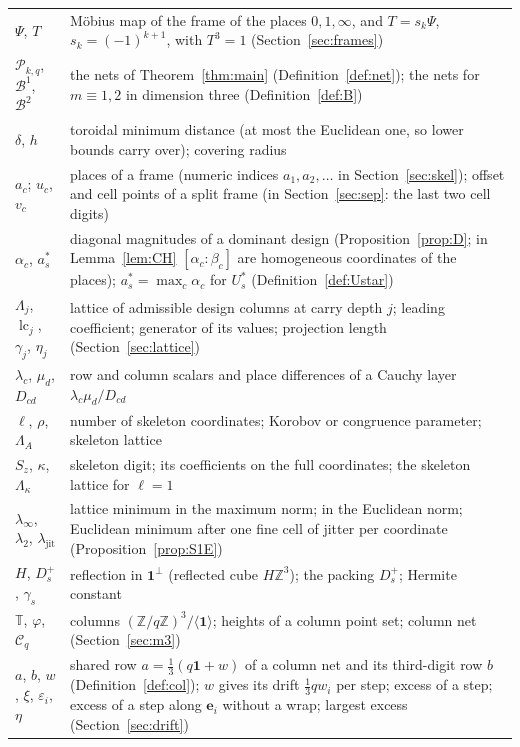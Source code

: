 \documentclass[11pt]{amsart}
\theoremstyle{definition}
\theoremstyle{plain}
\newcommand{\Z}{\mathbb{Z}}
\newcommand{\e}{\mathbf{e}}
\begin{document}
\begin{table}[tbp]
\begin{tabular}{@{}l>{\raggedright\arraybackslash}p{11.5cm}@{}}
$\Psi$, $T$ & M\"obius map of the frame of the places $0,1,\infty$, and $T=s_k\Psi$, $s_k=(-1)^{k+1}$, with $T^3=1$ (Section~\ref{sec:frames})\\
$\mathcal P_{k,q}$, $\mathcal B^1$, $\mathcal B^2$ & the nets of Theorem~\ref{thm:main} (Definition~\ref{def:net}); the nets for $m\equiv1,2$ in dimension three (Definition~\ref{def:B})\\
$\delta$, $h$ & toroidal minimum distance (at most the Euclidean one, so lower bounds carry over); covering radius\\
$a_c$; $u_c$, $v_c$ & places of a frame (numeric indices $a_1,a_2,\dots$ in Section~\ref{sec:skel}); offset and cell points of a split frame (in Section~\ref{sec:sep}: the last two cell digits)\\
$\alpha_c$, $a^*_s$ & diagonal magnitudes of a dominant design (Proposition~\ref{prop:D}; in Lemma~\ref{lem:CH} $[\alpha_c:\beta_c]$ are homogeneous coordinates of the places); $a^*_s=\max_c\alpha_c$ for $U^*_s$ (Definition~\ref{def:Ustar})\\
$\Lambda_j$, $\operatorname{lc}_j$, $\gamma_j$, $\eta_j$ & lattice of admissible design columns at carry depth $j$; leading coefficient; generator of its values; projection length (Section~\ref{sec:lattice})\\
$\lambda_c$, $\mu_d$, $D_{cd}$ & row and column scalars and place differences of a Cauchy layer $\lambda_c\mu_d/D_{cd}$\\
$\ell$, $\rho$, $\Lambda_A$ & number of skeleton coordinates; Korobov or congruence parameter; skeleton lattice\\
$S_z$, $\kappa$, $\Lambda_\kappa$ & skeleton digit; its coefficients on the full coordinates; the skeleton lattice for $\ell=1$\\
$\lambda_\infty$, $\lambda_2$, $\lambda_{\mathrm{jit}}$ & lattice minimum in the maximum norm; in the Euclidean norm; Euclidean minimum after one fine cell of jitter per coordinate (Proposition~\ref{prop:S1E})\\
$H$, $D_s^+$, $\gamma_s$ & reflection in $\mathbf 1^\perp$ (reflected cube $H\Z^3$); the packing $D_s^+$; Hermite constant\\
$\mathbb T$, $\varphi$, $\mathcal C_q$ & columns $(\Z/q\Z)^3/\langle\mathbf 1\rangle$; heights of a column point set; column net (Section~\ref{sec:m3})\\
$a$, $b$, $w$, $\xi$, $\varepsilon_i$, $\eta$ & shared row $a=\frac13(q\mathbf 1+w)$ of a column net and its third-digit row $b$ (Definition~\ref{def:col}); $w$ gives its drift $\frac13qw_i$ per step; excess of a step; excess of a step along $\e_i$ without a wrap; largest excess (Section~\ref{sec:drift})\\

\end{tabular}
\end{table}
\end{document}
